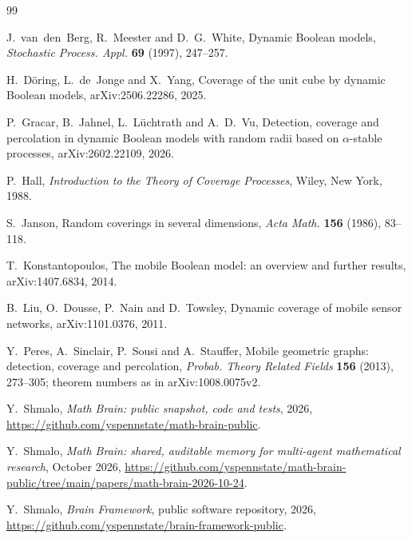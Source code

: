 \documentclass[11pt,a4paper]{article}
\numberwithin{equation}{section}
\theoremstyle{definition}
\theoremstyle{remark}
\begin{document}
\begin{thebibliography}{99}

 J.~van~den~Berg, R.~Meester and D.~G.~White, Dynamic Boolean models, \emph{Stochastic Process. Appl.} \textbf{69} (1997), 247--257.

 H.~D\"oring, L.~de~Jonge and X.~Yang, Coverage of the unit cube by dynamic Boolean models, arXiv:2506.22286, 2025.

 P.~Gracar, B.~Jahnel, L.~L\"uchtrath and A.~D.~Vu, Detection, coverage and percolation in dynamic Boolean models with random radii based on $\alpha$-stable processes, arXiv:2602.22109, 2026.

 P.~Hall, \emph{Introduction to the Theory of Coverage Processes}, Wiley, New York, 1988.

 S.~Janson, Random coverings in several dimensions, \emph{Acta Math.} \textbf{156} (1986), 83--118.

 T.~Konstantopoulos, The mobile Boolean model: an overview and further results, arXiv:1407.6834, 2014.

 B.~Liu, O.~Dousse, P.~Nain and D.~Towsley, Dynamic coverage of mobile sensor networks, arXiv:1101.0376, 2011.

 Y.~Peres, A.~Sinclair, P.~Sousi and A.~Stauffer, Mobile geometric graphs: detection, coverage and percolation, \emph{Probab. Theory Related Fields} \textbf{156} (2013), 273--305; theorem numbers as in arXiv:1008.0075v2.

 Y.~Shmalo, \emph{Math Brain: public snapshot, code and tests}, 2026, \url{https://github.com/yspennstate/math-brain-public}.

 Y.~Shmalo, \emph{Math Brain: shared, auditable memory for multi-agent mathematical research}, October 2026, \url{https://github.com/yspennstate/math-brain-public/tree/main/papers/math-brain-2026-10-24}.

 Y.~Shmalo, \emph{Brain Framework}, public software repository, 2026, \url{https://github.com/yspennstate/brain-framework-public}.

\end{thebibliography}
\end{document}
